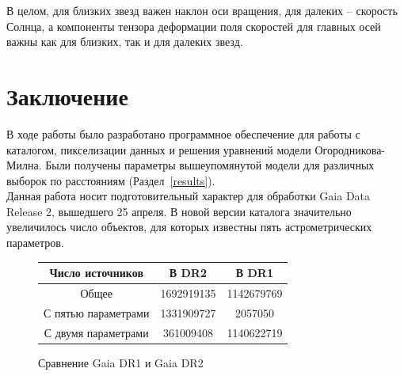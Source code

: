 \documentclass[14pt]{article} %
\begin{document}
В целом, для близких звезд важен наклон оси вращения, для далеких -- скорость Солнца, а компоненты тензора деформации поля скоростей для главных осей важны как для близких, так и для далеких звезд.
\section{Заключение}
В ходе работы было разработано программное обеспечение для работы с каталогом, пикселизации данных и решения уравнений модели Огородникова-Милна. Были получены параметры вышеупомянутой модели для различных выборок по расстояниям (Раздел~\ref{results}).\\

Данная работа носит подготовительный характер для обработки Gaia Data Release 2, вышедшего 25 апреля. В новой версии каталога значительно увеличилось число объектов, для которых известны пять астрометрических параметров.
\begin{figure}[!h]
\begin{tabular}{|c|c|c|}
\hline
Число источников&В DR2&В DR1\\
\hline
Общее&1692919135&1142679769\\
С пятью параметрами&1331909727&2057050\\
С двумя параметрами&361009408&1140622719\\
\hline
\end{tabular}
\caption*{Сравнение Gaia DR1 и Gaia DR2}
\end{figure}
\newpage



\end{document}

